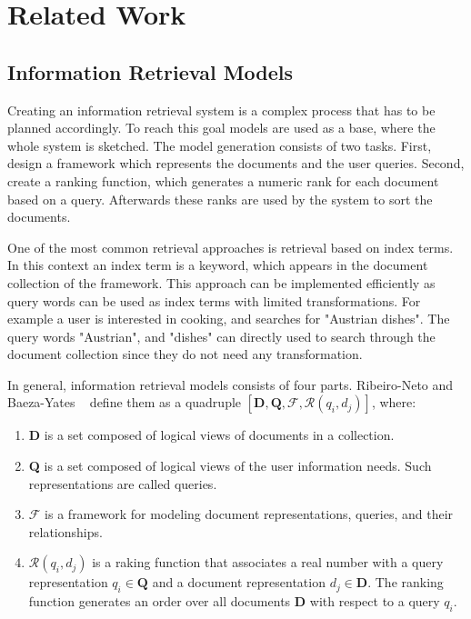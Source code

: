 \chapter{Related Work}
\label{cha:related_work}

\section{Information Retrieval Models}
\label{sec:information_retrieval_models}

Creating an information retrieval system is a complex process that has to be planned accordingly. To reach this goal models are used as a base, where the whole system is sketched. The model generation consists of two tasks. First, design a framework which represents the documents and the user queries. Second, create a ranking function, which generates a numeric rank for each document based on a query. Afterwards these ranks are used by the system to sort the documents.

One of the most common retrieval approaches is retrieval based on index terms. In this context an index term is a keyword, which appears in the document collection of the framework. This approach can be implemented efficiently as query words can be used as index terms with limited transformations. For example a user is interested in cooking, and searches for "Austrian dishes". The query words "Austrian", and "dishes" can directly used to search through the document collection since they do not need any transformation.

In general, information retrieval models consists of four parts. Ribeiro-Neto and Baeza-Yates ~\cite{ModernInvormationRetrieval1999} define them as a quadruple $[\textbf{D}, \textbf{Q}, \mathcal{F}, \mathcal{R}(q_i, d_j)]$, where:

\begin{enumerate}
  \item \textbf{D} is a set composed of logical views of documents in a collection.
  \item \textbf{Q} is a set composed of logical views of the user information needs. Such representations are called queries.
  \item $\mathcal{F}$ is a framework for modeling document representations, queries, and their relationships.
  \item $\mathcal{R}(q_i, d_j)$ is a raking function that associates a real number with a query representation $q_i \in \textbf{Q}$ and a document representation $d_j \in \textbf{D}$. The ranking function generates an order over all documents \textbf{D} with respect to a query $q_i$.
\end{enumerate}

